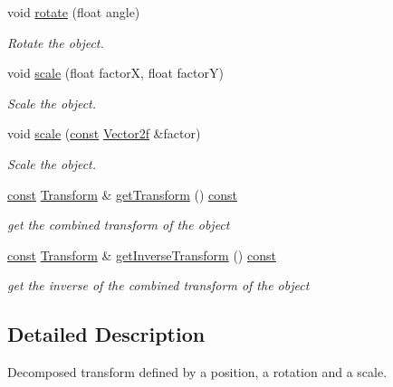 \begin{DoxyCompactItemize}
void \hyperlink{classsf_1_1_transformable_af8a5ffddc0d93f238fee3bf8efe1ebda}{rotate} (float angle)
\begin{DoxyCompactList}\small\item\em Rotate the object. \end{DoxyCompactList}\item 
void \hyperlink{classsf_1_1_transformable_a3de0c6d8957f3cf318092f3f60656391}{scale} (float factor\-X, float factor\-Y)
\begin{DoxyCompactList}\small\item\em Scale the object. \end{DoxyCompactList}\item 
void \hyperlink{classsf_1_1_transformable_adecaa6c69b1f27dd5194b067d96bb694}{scale} (\hyperlink{term__entry_8h_a57bd63ce7f9a353488880e3de6692d5a}{const} \hyperlink{namespacesf_a80cea3c46537294fd1d8d428566ad8b2}{Vector2f} \&factor)
\begin{DoxyCompactList}\small\item\em Scale the object. \end{DoxyCompactList}\item 
\hyperlink{term__entry_8h_a57bd63ce7f9a353488880e3de6692d5a}{const} \hyperlink{classsf_1_1_transform}{Transform} \& \hyperlink{classsf_1_1_transformable_a3b48c3362e3e2c14fef7551252deb7bb}{get\-Transform} () \hyperlink{term__entry_8h_a57bd63ce7f9a353488880e3de6692d5a}{const} 
\begin{DoxyCompactList}\small\item\em get the combined transform of the object \end{DoxyCompactList}\item 
\hyperlink{term__entry_8h_a57bd63ce7f9a353488880e3de6692d5a}{const} \hyperlink{classsf_1_1_transform}{Transform} \& \hyperlink{classsf_1_1_transformable_ab00de62b5d1efb2ee4cf2566dea98175}{get\-Inverse\-Transform} () \hyperlink{term__entry_8h_a57bd63ce7f9a353488880e3de6692d5a}{const} 
\begin{DoxyCompactList}\small\item\em get the inverse of the combined transform of the object \end{DoxyCompactList}\end{DoxyCompactItemize}


\subsection{Detailed Description}
Decomposed transform defined by a position, a rotation and a scale. 

